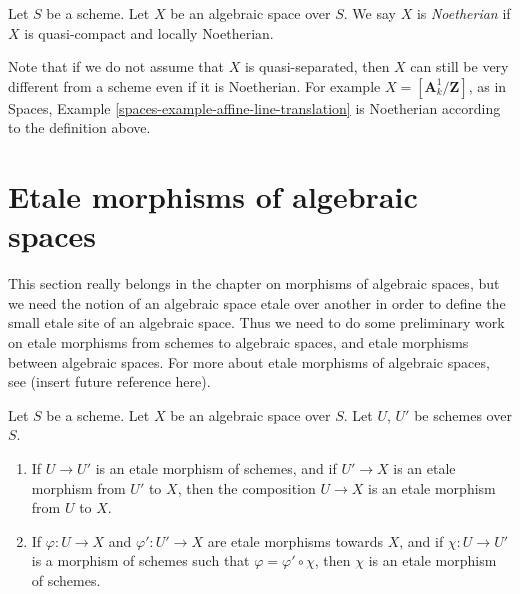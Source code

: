 \begin{definition}
\label{definition-noetherian}
Let $S$ be a scheme. Let $X$ be an algebraic space over $S$.
We say $X$ is {\it Noetherian}
if $X$ is quasi-compact and locally Noetherian.
\end{definition}

\noindent
Note that if we do not assume that $X$ is quasi-separated, then
$X$ can still be very different from a scheme
even if it is Noetherian. For example $X = [\mathbf{A}^1_k/\mathbf{Z}]$,
as in Spaces, Example \ref{spaces-example-affine-line-translation} is
Noetherian according to the definition above.





\section{Etale morphisms of algebraic spaces}
\label{section-etale-morphisms}

\noindent
This section really belongs in the chapter on morphisms of algebraic
spaces, but we need the notion of an algebraic space etale over another
in order to define the small etale site of an algebraic space.
Thus we need to do some preliminary work on etale morphisms from schemes to
algebraic spaces, and etale morphisms between algebraic spaces.
For more about etale morphisms of algebraic spaces, see
(insert future reference here).

\begin{lemma}
\label{lemma-etale-over-space}
Let $S$ be a scheme.
Let $X$ be an algebraic space over $S$.
Let $U$, $U'$ be schemes over $S$.
\begin{enumerate}
\item If $U \to U'$ is an etale morphism of schemes, and
if $U' \to X$ is an etale morphism from $U'$ to $X$, then the
composition $U \to X$ is an etale morphism from $U$ to $X$.
\item If $\varphi : U \to X$ and $\varphi' : U' \to X$ are
etale morphisms towards $X$, and if $\chi : U \to U'$ is a
morphism of schemes such that $\varphi = \varphi' \circ \chi$,
then $\chi$ is an etale morphism of schemes.
\end{enumerate}
\end{lemma}

